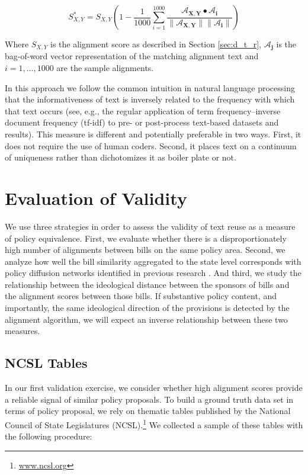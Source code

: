 \documentclass[12pt]{article} %
\begin{document}
\begin{equation}
    S^*_{X,Y} = S_{X,Y} \left(1 -
    \frac{1}{1000}\sum_{i=1}^{1000}\frac{\mathbf{\mathcal{A}_{X,Y}} \bullet
    {\mathbf{\mathcal{A}_i}}}{\lVert\mathbf{\mathcal{A}_{X,Y}\rVert\lVert\mathbf{\mathcal{A}_i}}\rVert}\right)
\end{equation}

Where $S_{X,Y}$ is the alignment score as described in Section \ref{sec:d_t_r},
$\mathbf{\mathcal{A}_j}$ is the bag-of-word vector representation of the
matching alignment text and $i = 1,\dots,1000$ are the sample alignments.

In this approach we follow the common intuition in natural language processing that the informativeness of text is inversely related to the frequency with which that text occurs \citep{robertson2004understanding} (see, e.g., the regular application of term frequency–inverse document frequency (tf-idf) to pre- or post-process text-based datasets and results). This measure is different and potentially preferable in two ways. First, it does not require the use of human coders. Second, it places text on a continuum of uniqueness rather than dichotomizes it as boiler plate or not.


\section{Evaluation of Validity}

We use three strategies in order to assess the validity of text reuse as a measure of policy equivalence. First, we evaluate whether there is a disproportionately high number of alignments between bills on the same policy area. Second, we analyze how well the bill similarity aggregated to the state level corresponds with policy diffusion networks identified in previous research \citep{desmarais2015}. And third, we study the relationship between the ideological distance between the sponsors of bills and the alignment scores between those bills. If substantive policy content, and importantly, the same ideological direction of the provisions is detected by the alignment algorithm, we will expect an inverse relationship between these two measures.


\subsection{NCSL Tables}

In our first validation exercise, we consider whether high alignment scores provide a reliable signal of similar policy proposals. To build a ground truth data set in terms of policy proposal, we rely on thematic tables published by the National Council of State Legislatures (NCSL).\footnote{\url{www.ncsl.org}}  We collected a sample of these tables with the following procedure:
\end{document}
